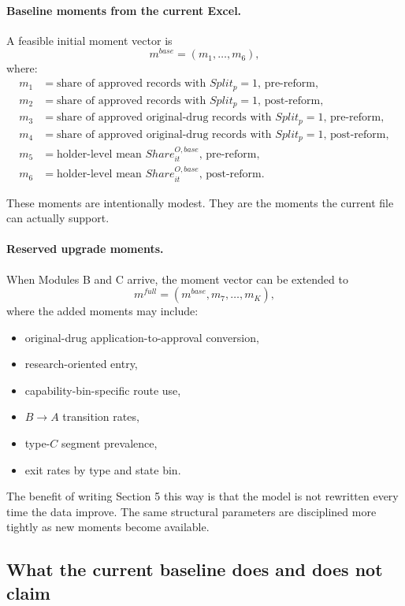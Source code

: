 \documentclass[12pt]{article}
\begin{document}
\paragraph{Baseline moments from the current Excel.}
A feasible initial moment vector is
\[
m^{base}=
(m_1,\dots,m_6),
\]
where:
\begin{align*}
m_1 &= \text{share of approved records with }Split_p=1\text{, pre-reform},\\
m_2 &= \text{share of approved records with }Split_p=1\text{, post-reform},\\
m_3 &= \text{share of approved original-drug records with }Split_p=1\text{, pre-reform},\\
m_4 &= \text{share of approved original-drug records with }Split_p=1\text{, post-reform},\\
m_5 &= \text{holder-level mean }Share_{it}^{O,base}\text{, pre-reform},\\
m_6 &= \text{holder-level mean }Share_{it}^{O,base}\text{, post-reform}.
\end{align*}

These moments are intentionally modest. They are the moments the current file can actually
support.

\paragraph{Reserved upgrade moments.}
When Modules B and C arrive, the moment vector can be extended to
\[
m^{full}=(m^{base},m_7,\dots,m_K),
\]
where the added moments may include:
\begin{itemize}
\item original-drug application-to-approval conversion,
\item research-oriented entry,
\item capability-bin-specific route use,
\item \(B\rightarrow A\) transition rates,
\item type-\(C\) segment prevalence,
\item exit rates by type and state bin.
\end{itemize}

The benefit of writing Section 5 this way is that the model is not rewritten every time the data
improve. The same structural parameters are disciplined more tightly as new moments become
available.

\subsection{What the current baseline does and does not claim}
\end{document}
